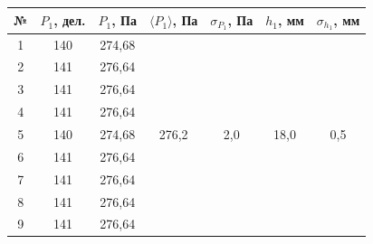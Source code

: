 \documentclass[a4paper, 12pt]{article}
\begin{document}
    \begin{table}[H]
    	\centering
    	\begin{tabular}{ccccccc}
    		\hline
    		\multicolumn{1}{|c|}{№} &
    		\multicolumn{1}{c|}{$ P_1 $, дел.} &
    		\multicolumn{1}{c|}{$ P_1 $, Па} &
    		\multicolumn{1}{c|}{$ \langle P_1 \rangle $, Па} &
    		\multicolumn{1}{c|}{$ \sigma_{P_1} $, Па} &
    		\multicolumn{1}{c|}{$ h_1 $, мм} &
    		\multicolumn{1}{c|}{$ \sigma_{h_1} $, мм} \\ \hline
                \multicolumn{1}{|c|}{1} & \multicolumn{1}{c|}{140} & \multicolumn{1}{c|}{274,68} & \multicolumn{1}{c|}{\multirow{10}{*}{276,2}} & \multicolumn{1}{c|}{\multirow{10}{*}{2,0}} & \multicolumn{1}{c|}{\multirow{10}{*}{18,0}} & \multicolumn{1}{c|}{\multirow{10}{*}{0,5}} \\ \cline{1-3}
                \multicolumn{1}{|c|}{2}     & \multicolumn{1}{c|}{141} & \multicolumn{1}{c|}{276,64} & \multicolumn{1}{c|}{} & \multicolumn{1}{c|}{} & \multicolumn{1}{c|}{} & \multicolumn{1}{c|}{} \\ \cline{1-3}
                \multicolumn{1}{|c|}{3} & \multicolumn{1}{c|}{141} & \multicolumn{1}{c|}{276,64} & \multicolumn{1}{c|}{} & \multicolumn{1}{c|}{} & \multicolumn{1}{c|}{} & \multicolumn{1}{c|}{} \\ \cline{1-3}
                \multicolumn{1}{|c|}{4} & \multicolumn{1}{c|}{141} & \multicolumn{1}{c|}{276,64} & \multicolumn{1}{c|}{} & \multicolumn{1}{c|}{} & \multicolumn{1}{c|}{} & \multicolumn{1}{c|}{} \\ \cline{1-3}
                \multicolumn{1}{|c|}{5} & \multicolumn{1}{c|}{140} & \multicolumn{1}{c|}{274,68} & \multicolumn{1}{c|}{} & \multicolumn{1}{c|}{} & \multicolumn{1}{c|}{} & \multicolumn{1}{c|}{} \\ \cline{1-3}
                \multicolumn{1}{|c|}{6} & \multicolumn{1}{c|}{141} & \multicolumn{1}{c|}{276,64} & \multicolumn{1}{c|}{} & \multicolumn{1}{c|}{} & \multicolumn{1}{c|}{} & \multicolumn{1}{c|}{} \\ \cline{1-3}
                \multicolumn{1}{|c|}{7} & \multicolumn{1}{c|}{141} & \multicolumn{1}{c|}{276,64} & \multicolumn{1}{c|}{} & \multicolumn{1}{c|}{} & \multicolumn{1}{c|}{} & \multicolumn{1}{c|}{} \\ \cline{1-3}
                \multicolumn{1}{|c|}{8} & \multicolumn{1}{c|}{141} & \multicolumn{1}{c|}{276,64} & \multicolumn{1}{c|}{} & \multicolumn{1}{c|}{} & \multicolumn{1}{c|}{} & \multicolumn{1}{c|}{} \\ \cline{1-3}
                \multicolumn{1}{|c|}{9} & \multicolumn{1}{c|}{141} & \multicolumn{1}{c|}{276,64} & \multicolumn{1}{c|}{} & \multicolumn{1}{c|}{} & \multicolumn{1}{c|}{} & \multicolumn{1}{c|}{} \\ \cline{1-3}

\end{tabular}
\end{table}
\end{document}
